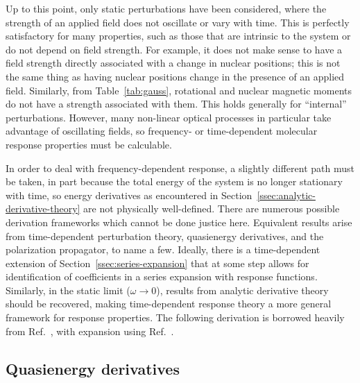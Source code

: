 \documentclass[%
class = book,%
crop = false,%
float = true,%
multi = true,%
preview = false,%
]{standalone}
\let\cite\autocite
\begin{document}
Up to this point, only static perturbations have been considered, where the strength of an applied field does not oscillate or vary with time. This is perfectly satisfactory for many properties, such as those that are intrinsic to the system or do not depend on field strength. For example, it does not make sense to have a field strength directly associated with a change in nuclear positions; this is not the same thing as having nuclear positions change in the presence of an applied field. Similarly, from Table~\ref{tab:gauss}, rotational and nuclear magnetic moments do not have a strength associated with them. This holds generally for ``internal'' perturbations. However, many non-linear optical processes in particular take advantage of oscillating fields, so frequency- or time-dependent molecular response properties must be calculable.

In order to deal with frequency-dependent response, a slightly different path must be taken, in part because the total energy of the system is no longer stationary with time, so energy derivatives as encountered in Section~\ref{ssec:analytic-derivative-theory} are not physically well-defined. There are numerous possible derivation frameworks which cannot be done justice here. Equivalent results arise from time-dependent perturbation theory, quasienergy derivatives\cite{Christiansen1998,gauss2000,C1CP21951K,Toulouse2015}, and the polarization propagator\cite{mcweeny1989methods}, to name a few. Ideally, there is a time-dependent extension of Section~\ref{ssec:series-expansion} that at some step allows for identification of coefficients in a series expansion with response functions. Similarly, in the static limit (\(\omega \rightarrow 0\)), results from analytic derivative theory should be recovered, making time-dependent response theory a more general framework for response properties. The following derivation is borrowed heavily from Ref.~\parencite{Toulouse2015}, with expansion using Ref.~\parencite{gauss2000}.

\subsection{Quasienergy derivatives}
\end{document}
